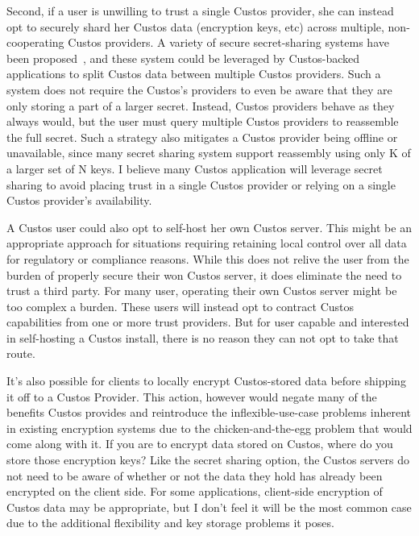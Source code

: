 Second, if a user is unwilling to trust a single Custos provider, she
can instead opt to securely shard her Custos data (encryption keys,
etc) across multiple, non-cooperating Custos providers. A variety of
secure secret-sharing systems have been proposed~\cite{Shamir1979,
  Resch2011, Krawczyk1993}, and these system could be leveraged by
Custos-backed applications to split Custos data between multiple
Custos providers. Such a system does not require the Custos's
providers to even be aware that they are only storing a part of a
larger secret. Instead, Custos providers behave as they always would,
but the user must query multiple Custos providers to reassemble the
full secret. Such a strategy also mitigates a Custos provider being
offline or unavailable, since many secret sharing system support
reassembly using only K of a larger set of N keys. I believe many
Custos application will leverage secret sharing to avoid placing trust
in a single Custos provider or relying on a single Custos provider's
availability.

A Custos user could also opt to self-host her own Custos server. This
might be an appropriate approach for situations requiring retaining
local control over all data for regulatory or compliance
reasons. While this does not relive the user from the burden of
properly secure their won Custos server, it does eliminate the need to
trust a third party. For many user, operating their own Custos server
might be too complex a burden. These users will instead opt to
contract Custos capabilities from one or more trust providers. But for
user capable and interested in self-hosting a Custos install, there is
no reason they can not opt to take that route.

It's also possible for clients to locally encrypt Custos-stored data
before shipping it off to a Custos Provider. This action, however
would negate many of the benefits Custos provides and reintroduce the
inflexible-use-case problems inherent in existing encryption systems
due to the chicken-and-the-egg problem that would come along with
it. If you are to encrypt data stored on Custos, where do you store
those encryption keys? Like the secret sharing option, the Custos
servers do not need to be aware of whether or not the data they hold
has already been encrypted on the client side. For some applications,
client-side encryption of Custos data may be appropriate, but I don't
feel it will be the most common case due to the additional flexibility
and key storage problems it poses.

